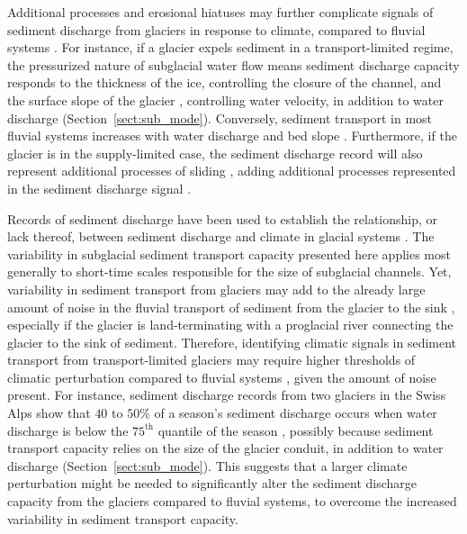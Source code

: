 \documentclass[11pt]{article}
\begin{document}
\begin{spacing}{1}
                    Additional processes and erosional hiatuses may further complicate signals of sediment discharge from glaciers in response to climate, compared to fluvial systems \citep{jansson2005,ganti2016}. 
    For instance, if a glacier expels sediment in a transport-limited regime, the pressurized nature of subglacial water flow means sediment discharge capacity responds to the thickness of the ice, controlling the closure of the channel, and the surface slope of the glacier \citep{rothlisberger1972,shreve1972}, controlling water velocity, in addition to water discharge (Section~\ref{sect:sub_mode}).
          Conversely, sediment transport in most fluvial systems increases with water discharge and bed slope \citep[Section~\ref{sect:fluv}; e.g.][]{muller1968,whipple1999,wong2006}. 
          Furthermore, if the glacier is in the supply-limited case, the sediment discharge record will also represent additional processes of sliding  \citep{herman2015,seguinot2021}, adding additional processes represented in the sediment discharge signal \citep{delaney2019}.
          
           Records of sediment discharge have been used to establish the relationship, or lack thereof, between sediment discharge and climate in glacial systems \citep[e.g.][]{koppes2009a,willenbring2016,mariotti2021}.
          The variability in subglacial sediment transport capacity presented here applies most generally to short-time scales responsible for the size of subglacial channels.
          Yet, variability in sediment transport from glaciers may add to the already large amount of noise in the fluvial transport of sediment from the glacier to the sink  \citep{castletort2003,jerolmack2010,romans2016}, especially if the glacier is land-terminating with a proglacial river connecting the glacier to the sink of sediment.
           Therefore, identifying climatic signals in sediment transport from transport-limited glaciers may require higher thresholds of climatic perturbation compared to fluvial systems \citep{tofelde2021}, given the amount of noise present.
          For instance, sediment discharge records from two glaciers in the Swiss Alps show that $40$ to $50$\% of a season's sediment discharge occurs when water discharge is below the $75^{\mathrm{th}}$ quantile of the season \citep{delaney2018}, possibly because sediment transport capacity relies on the size of the glacier conduit, in addition to water discharge (Section~\ref{sect:sub_mode}).
          This suggests that a larger climate perturbation might be needed to significantly alter the sediment discharge capacity from the glaciers compared to fluvial systems, to overcome the increased variability in sediment transport capacity.
         


\end{spacing}
\end{document}
